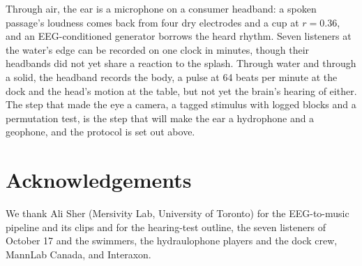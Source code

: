 \documentclass[conference]{IEEEtran}
\begin{document}
Through air, the ear is a microphone on a consumer headband: a spoken passage's loudness comes back from four dry electrodes and a cup at $r = 0.36$, and an EEG-conditioned generator borrows the heard rhythm. Seven listeners at the water's edge can be recorded on one clock in minutes, though their headbands did not yet share a reaction to the splash. Through water and through a solid, the headband records the body, a pulse at 64 beats per minute at the dock and the head's motion at the table, but not yet the brain's hearing of either. The step that made the eye a camera, a tagged stimulus with logged blocks and a permutation test, is the step that will make the ear a hydrophone and a geophone, and the protocol is set out above.

\section*{Acknowledgements}
We thank Ali Sher (Mersivity Lab, University of Toronto) for the EEG-to-music pipeline and its clips and for the hearing-test outline, the seven listeners of October 17 and the swimmers, the hydraulophone players and the dock crew, MannLab Canada, and Interaxon.



\end{document}
